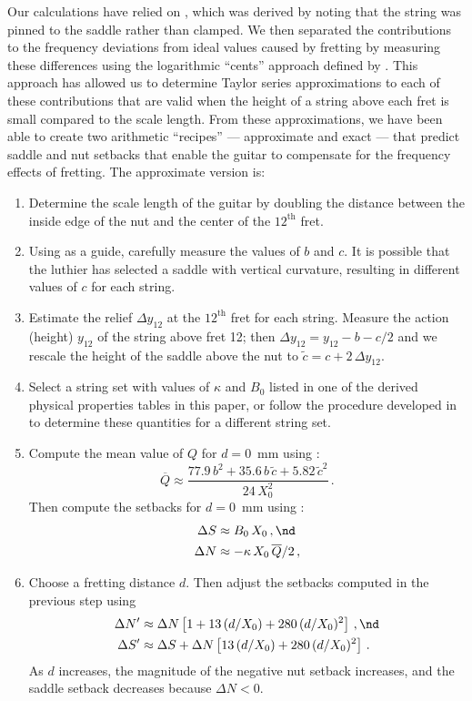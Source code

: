 Our calculations have relied on , which was derived by noting that the string was pinned to the saddle rather than clamped. We then separated the contributions to the frequency deviations from ideal values caused by fretting by measuring these differences using the logarithmic ``cents'' approach defined by . This approach has allowed us to determine Taylor series approximations to each of these contributions that are valid when the height of a string above each fret is small compared to the scale length. From these approximations, we have been able to create two arithmetic ``recipes'' --- approximate and exact --- that predict saddle and nut setbacks that enable the guitar to compensate for the frequency effects  of fretting. The approximate version is:
\begin{enumerate}
    \item Determine the scale length of the guitar by doubling the distance between the inside edge of the nut and the center of the $12^\textrm{th}$ fret. 
    \item Using  as a guide, carefully measure the values of $b$ and $c$. It is possible that the luthier has selected a saddle with vertical curvature, resulting in different values of $c$ for each string.
    \item Estimate the relief $\Delta y_{12}$ at the $12^\textrm{th}$ fret for each string. Measure the action (height) $y_{12}$ of the string above fret 12; then $\Delta y_{12} = y_{12} - b - c/2$ and we rescale the height of the saddle above the nut to $\tilde{c} = c + 2\, \Delta y_{12}$.
    \item Select a string set with values of $\kappa$ and $B_0$ listed in one of the derived physical properties tables in this paper, or follow the procedure developed in  to determine these quantities for a different string set.
    \item Compute the mean value of $Q$ for $d = 0$~mm using :
    \begin{equation*}
        \overline{Q} \approx \frac{77.9\, b^2 + 35.6\, b\, \tilde{c} + 5.82\, \tilde{c}^{2}}{24\, X_0^2}\, .
    \end{equation*}
    Then compute the setbacks for $d = 0$~mm using :
    \begin{align*}
        \Delta S &\approx B_0\, X_0\, , \nd \\
        \Delta N &\approx - \kappa\, X_0\, \overline{Q} / 2\, ,
    \end{align*}
    \item Choose a fretting distance $d$. Then adjust the setbacks computed in the previous step using
    \begin{align*}
        \Delta N^\prime &\approx \Delta N \left[ 1 + 13\, (d/X_0) + 280\, (d/X_0)^2 \right]\, , \nd \\
        \Delta S^\prime &\approx \Delta S + \Delta N \left[13\, (d/X_0) + 280\, (d/X_0)^2 \right]\, .
    \end{align*}
    As $d$ increases, the magnitude of the negative nut setback increases, and the saddle setback decreases because $\Delta N < 0$. 
\end{enumerate}
